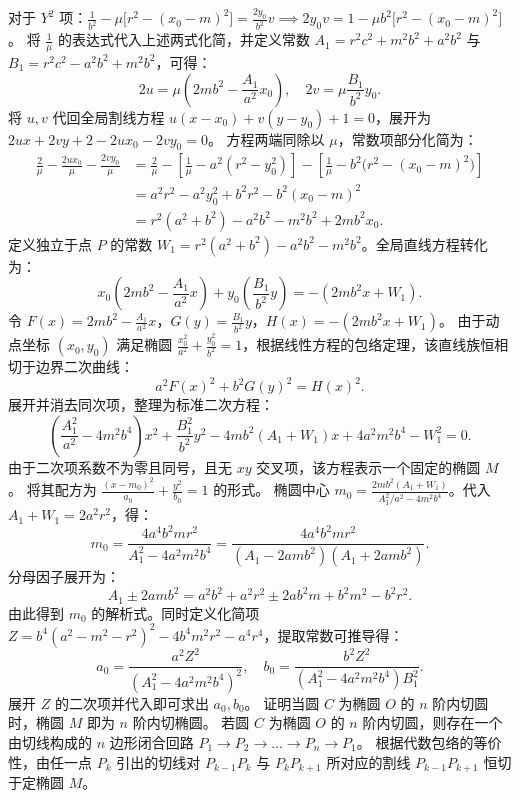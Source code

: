 \begin{solution}
对于 $Y^2$ 项：$\frac{1}{b^2} - \mu\big[r^2 - (x_0-m)^2\big] = \frac{2y_0}{b^2} v \implies 2y_0 v = 1 - \mu b^2\big[r^2 - (x_0-m)^2\big]$。
将 $\frac{1}{\mu}$ 的表达式代入上述两式化简，并定义常数 $A_1 = r^2 c^2 + m^2 b^2 + a^2 b^2$ 与 $B_1 = r^2 c^2 - a^2 b^2 + m^2 b^2$，可得：
\[ 2u = \mu \left( 2m b^2 - \frac{A_1}{a^2} x_0 \right), \quad 2v = \mu \frac{B_1}{b^2} y_0. \]
将 $u, v$ 代回全局割线方程 $u(x-x_0) + v(y-y_0) + 1 = 0$，展开为 $2ux + 2vy + 2 - 2ux_0 - 2vy_0 = 0$。
方程两端同除以 $\mu$，常数项部分化简为：
\begin{align*}
\frac{2}{\mu} - \frac{2ux_0}{\mu} - \frac{2vy_0}{\mu} &= \frac{2}{\mu} - \left[ \frac{1}{\mu} - a^2(r^2 - y_0^2) \right] - \left[ \frac{1}{\mu} - b^2\big(r^2 - (x_0 - m)^2\big) \right] \\
&= a^2 r^2 - a^2 y_0^2 + b^2 r^2 - b^2(x_0 - m)^2 \\
&= r^2(a^2 + b^2) - a^2 b^2 - m^2 b^2 + 2m b^2 x_0.
\end{align*}
定义独立于点 $P$ 的常数 $W_1 = r^2(a^2 + b^2) - a^2 b^2 - m^2 b^2$。全局直线方程转化为：
\[ x_0 \left( 2m b^2 - \frac{A_1}{a^2} x \right) + y_0 \left( \frac{B_1}{b^2} y \right) = -(2m b^2 x + W_1). \]
令 $F(x) = 2m b^2 - \frac{A_1}{a^2} x$，$G(y) = \frac{B_1}{b^2} y$，$H(x) = -(2m b^2 x + W_1)$。
由于动点坐标 $(x_0, y_0)$ 满足椭圆 $\frac{x_0^2}{a^2} + \frac{y_0^2}{b^2} = 1$，根据线性方程的包络定理，该直线族恒相切于边界二次曲线：
\[ a^2 F(x)^2 + b^2 G(y)^2 = H(x)^2. \]
展开并消去同次项，整理为标准二次方程：
\[ \left( \frac{A_1^2}{a^2} - 4m^2 b^4 \right) x^2 + \frac{B_1^2}{b^2} y^2 - 4m b^2(A_1 + W_1) x + 4a^2 m^2 b^4 - W_1^2 = 0. \]
由于二次项系数不为零且同号，且无 $xy$ 交叉项，该方程表示一个固定的椭圆 $M$。
将其配方为 $\frac{(x - m_0)^2}{a_0} + \frac{y^2}{b_0} = 1$ 的形式。
椭圆中心 $m_0 = \frac{2m b^2(A_1 + W_1)}{A_1^2 / a^2 - 4m^2 b^4}$。代入 $A_1 + W_1 = 2a^2 r^2$，得：
\[ m_0 = \frac{4a^4 b^2 m r^2}{A_1^2 - 4a^2 m^2 b^4} = \frac{4a^4 b^2 m r^2}{(A_1 - 2amb^2)(A_1 + 2amb^2)}. \]
分母因子展开为：
\[ A_1 \pm 2amb^2 = a^2b^2 + a^2r^2 \pm 2ab^2m + b^2m^2 - b^2r^2. \]
由此得到 $m_0$ 的解析式。同时定义化简项 $Z = b^4(a^2 - m^2 - r^2)^2 - 4b^4 m^2 r^2 - a^4 r^4$，提取常数可推导得：
\[ a_0 = \frac{a^2 Z^2}{(A_1^2 - 4a^2 m^2 b^4)^2}, \quad b_0 = \frac{b^2 Z^2}{(A_1^2 - 4a^2 m^2 b^4) B_1^2}. \]
展开 $Z$ 的二次项并代入即可求出 $a_0, b_0$。
证明当圆 $C$ 为椭圆 $O$ 的 $n$ 阶内切圆时，椭圆 $M$ 即为 $n$ 阶内切椭圆。
若圆 $C$ 为椭圆 $O$ 的 $n$ 阶内切圆，则存在一个由切线构成的 $n$ 边形闭合回路 $P_1 \to P_2 \to \dots \to P_n \to P_1$。
根据代数包络的等价性，由任一点 $P_k$ 引出的切线对 $P_{k-1}P_k$ 与 $P_k P_{k+1}$ 所对应的割线 $P_{k-1}P_{k+1}$ 恒切于定椭圆 $M$。

\end{solution}
